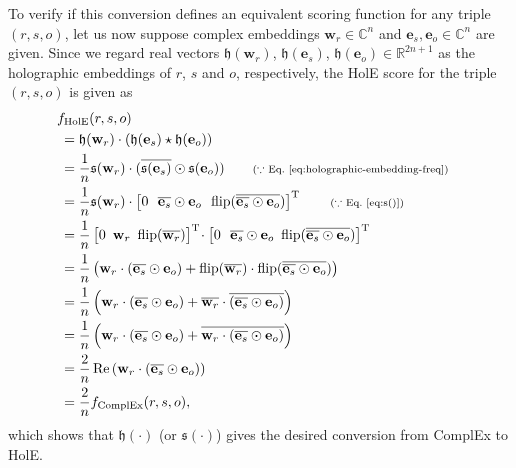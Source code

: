 \documentclass[11pt,a4paper]{article}
\def\mat#1{\boldsymbol{\mathbf{#1}}}
\def\transpose{^{\mathrm{T}}}
\def\Cset{\mathbb{C}}
\def\Rset{\mathbb{R}}
\let\ccorr\star
\let\hprod\odot
\def\RE{\mathop{\text{Re}}}
\def\flip{\mathop{\text{flip}}}
\begin{document}
To verify if this conversion defines an equivalent scoring function for any triple $(r, s, o)$,
let us now suppose complex embeddings $\mat{w}_r \in \Cset^n$ and $\mat{e}_s, \mat{e}_o \in \Cset^n$ are given.
Since we regard real vectors $\mathfrak{h}(\mat{w}_r)$, $\mathfrak{h}(\mat{e}_s)$, $\mathfrak{h}(\mat{e}_o) \in \Rset^{2n+1}$
as the holographic embeddings of $r$, $s$ and $o$, respectively,
the HolE score for the triple $(r,s,o)$ is given as
\begin{align*}
  \rlap{ $ f_{\text{HolE}}(r,s,o) $ } \;\; \\
        & = \mathfrak{h}(\mat{w}_r) \cdot ( \mathfrak{h}(\mat{e}_s) \ccorr \mathfrak{h}(\mat{e}_o )) \\
        & = \frac{1}{n} \mathfrak{s}(\mat{w}_r) \cdot ( \overline{ \mathfrak{s}(\mat{e}_s) } \hprod \mathfrak{s}(\mat{e}_o))
          \tag*{\scriptsize ($\because$ Eq.~\eqref{eq:holographic-embedding-freq}) } \\
        & = \frac{1}{n} \mathfrak{s}(\mat{w}_r)
          \cdot
          \begin{bmatrix}
             0 & \!\! \overline{ \mat{e}_s } \hprod \mat{e}_o & \!\! \flip( \overline{ \overline{ \mat{e}_s } \hprod \mat{e}_o } )
          \end{bmatrix} \transpose
                                                           \tag*{\scriptsize ($\because$ Eq.~\eqref{eq:s()}) } \\
        & = \frac{1}{n} 
          \begin{bmatrix}
            0 & \!\!\! \mat{w}_r & \!\!\! \flip( \overline{ \mat{w}_r } )
          \end{bmatrix} \transpose \!
          \cdot 
          \begin{bmatrix}
            0 & \!\! \overline{ \mat{e}_s } \hprod \mat{e}_o & \!\!\! \flip( \overline{ \overline{ \mat{e}_s } \hprod \mat{e}_o } )
          \end{bmatrix} \transpose \\
        & = \frac{1}{n}     \left( \mat{w}_r     \cdot                   ( \overline{ \mat{e}_s } \hprod \mat{e}_o )
          + \flip(      \overline{ \mat{w}_r } ) \cdot \flip( \overline{   \overline{ \mat{e}_s } \hprod \mat{e}_o } ) \right) \\
        & = \frac{1}{n}     \left( \mat{w}_r     \cdot                   ( \overline{ \mat{e}_s } \hprod \mat{e}_o )
          +             \overline{ \mat{w}_r }   \cdot        \overline{ ( \overline{ \mat{e}_s } \hprod \mat{e}_o ) } \right) \\
        & = \frac{1}{n}     \left( \mat{w}_r     \cdot                   ( \overline{ \mat{e}_s } \hprod \mat{e}_o )
          +             \overline{ \mat{w}_r     \cdot                   ( \overline{ \mat{e}_s } \hprod \mat{e}_o ) } \right) \\
        & = \frac{2}{n} \RE \left( \mat{w}_r     \cdot                   ( \overline{ \mat{e}_s } \hprod \mat{e}_o ) \right) \\
        & = \frac{2}{n} f_{\text{ComplEx}}(r,s,o),
\end{align*}
which shows that $\mathfrak{h}(\cdot)$ (or $\mathfrak{s}(\cdot)$) gives the desired conversion from ComplEx to HolE.
\end{document}
